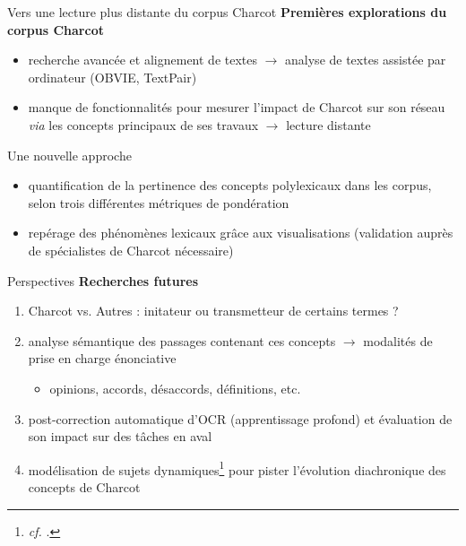 \begin{frame}{Vers une lecture plus distante du corpus Charcot}
\textbf{Premières explorations du corpus Charcot}
    \begin{itemize}
        \item recherche avancée et alignement de textes $\rightarrow$ analyse de textes assistée par ordinateur (OBVIE, TextPair)
        \item manque de fonctionnalités pour mesurer l’impact de Charcot sur son réseau \textit{via} les concepts principaux de ses travaux $\rightarrow$ lecture distante
    \end{itemize}
    \begin{block}{Une nouvelle approche}
        \begin{itemize}
    \item quantification de la pertinence des concepts polylexicaux dans les corpus, selon trois différentes métriques de pondération
    \item repérage des phénomènes lexicaux grâce aux visualisations (validation auprès de
spécialistes de Charcot nécessaire)
\end{itemize}
    \end{block}
\end{frame}

\begin{frame}{Perspectives}
\textbf{Recherches futures}
    \begin{enumerate}
        \item Charcot vs. Autres : initateur ou transmetteur de certains termes ?
        \item analyse sémantique des passages contenant ces concepts $\rightarrow{}$ modalités de prise en charge énonciative
        \begin{itemize}
            \item opinions,
accords, désaccords, définitions, etc.
        \end{itemize}
        \item post-correction automatique d'OCR (apprentissage profond) et évaluation de son impact sur des tâches en aval
        \item modélisation de sujets dynamiques\footnote{\textit{cf.} \cite{blei2006}.} pour pister l'évolution diachronique des concepts de Charcot
    \end{enumerate}
\end{frame}

